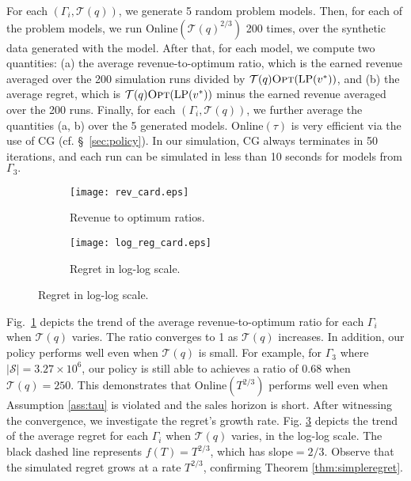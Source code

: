 \documentclass{article}
\theoremstyle{definition}
\newcommand{\SSS}{\mathcal{S}}
\newcommand{\TTT}{\mathcal{T}}
\begin{document}
For each $(\Gamma_i, \TTT(q))$, we generate 5 random problem models. Then, for each of the problem models, we run {\sc Online}$(\TTT(q)^{2/3})$ 200 times, over the synthetic data generated with the model. After that, for each model, we compute two quantities: (a) the average revenue-to-optimum ratio, which is the earned revenue averaged over the 200 simulation runs divided by $\TTT(q)\text{{\sc Opt}}(\text{LP}(v^*))$, and (b) the average regret, which is $\TTT(q)\text{{\sc Opt}}(\text{LP}(v^*))$ minus the earned revenue averaged over the 200 runs. Finally, for each $(\Gamma_i, \TTT(q))$, we further average the quantities (a, b) over the 5 generated models. {\sc Online}$(\tau)$ is very efficient via the use of CG (cf. \S~\ref{sec:policy}). In our simulation, CG always terminates in 50 iterations, and each run can be simulated in less than 10 seconds for models from $\Gamma_3.$
\begin{figure}[t]
\vspace{-0.2cm}
\hspace{-0.6cm}
\centering
\begin{subfigure}[b]{0.26\textwidth}
\texttt{[image: rev\_card.eps]}
\caption{Revenue to optimum ratios.}
\label{fig:ratio}
\end{subfigure}
\hspace{-0.6cm}
\begin{subfigure}[b]{0.26\textwidth}
\texttt{[image: log\_reg\_card.eps]}
\caption{Regret in log-log scale.}\label{fig:regret}
\end{subfigure}
\hspace{-0.6cm}
\vspace{-0.2cm}
\end{figure}

Fig.~\ref{fig:ratio} depicts the trend of the average revenue-to-optimum ratio for each $\Gamma_i$ when $ \TTT(q)$ varies. The ratio converges to 1 as $\TTT(q)$ increases. In addition, our policy performs well even when $\TTT(q)$ is small. For example, for $\Gamma_3$ where $|\SSS| = 3.27\times 10^6$, our policy is still able to achieves a ratio of 0.68 when $\TTT(q) = 250$. This demonstrates that {\sc Online}$(T^{2/3})$ performs well even when Assumption \ref{ass:tau} is violated and the sales horizon is short. After witnessing the convergence, we investigate the regret's growth rate. Fig. \ref{fig:regret} depicts the trend of the average regret for each $\Gamma_i$ when $ \TTT(q)$ varies, in the log-log scale. The black dashed line represents $f(T) = T^{2/3}$, which has slope$=2/3$. Observe that the simulated regret grows at a rate $T^{2/3}$, confirming Theorem \ref{thm:simpleregret}.
\end{document}

